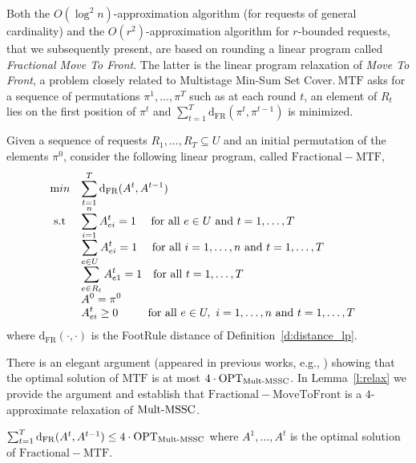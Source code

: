 Both the $O(\log^2 n)$-approximation algorithm (for requests of general cardinality) and the $O(r^2 )$-approximation algorithm for $r$-bounded requests, that we subsequently present,
are based on rounding a linear program called \textit{Fractional Move To Front}. The latter is the linear program relaxation of \textit{Move To Front}, a problem closely related to Multistage Min-Sum Set Cover.$~\mathrm{MTF}$ asks for a sequence of permutations $\pi^1,\ldots,\pi^T$ such as at each round $t$, an element of $R_t$ lies on the first position of $\pi^t$ and $\sum_{t=1}^T \mathrm{d}_{\mathrm{FR}}(\pi^t,\pi^{t-1})$ is minimized.

\begin{definition}\label{d:frac_MTF}
Given a sequence of requests $R_1,\ldots,R_T \subseteq U$ and an initial permutation of the elements $\pi^0$, consider the following linear program, called $\mathrm{Fractional- MTF}$,
\begin{equation*}
    \begin{array}{ll@{}ll}
        \text min & \displaystyle \sum_{t=1}^{T} \mathrm{d}_{\mathrm{FR}}(A^t,A^{t-1})&\\
        \text{ s.t } & \displaystyle \sum_{i=1}^{n} A_{ei}^t = 1 ~~~~\text{for all }e \in U\text{ and } t = 1,\ldots, T &&\\
        & \displaystyle \sum_{e \in U} A_{ei}^t = 1 ~~~~\text{for all }i = 1,\ldots,n\text{ and } t = 1,\ldots, T&\\
        & \displaystyle \sum_{e \in R_t} A_{e1}^t = 1 ~~~\text{for all } t = 1,\ldots, T&\\
        & \displaystyle A^0 = \pi^0 &&\\
        & \displaystyle A_{ei}^t \geq 0 ~~~~~~~~\text{for all } e \in U, ~i = 1,\ldots, n\text{ and } t = 1,\ldots, T&\\
    \end{array}
\end{equation*}
where $\mathrm{d}_{\mathrm{FR}}(\cdot,\cdot)$ is the FootRule distance of Definition~\ref{d:distance_lp}.
\end{definition}
\noindent  There is an elegant argument (appeared in previous works, e.g., \cite{FKKSV20})
showing that the optimal solution of $\mathrm{MTF}$ is at most $4 \cdot \mathrm{OPT}_{\mathrm{Mult}\text{-}\mathrm{MSSC}}$. In Lemma~\ref{l:relax} we provide the argument and establish that $\mathrm{Fractional- MoveToFront}$ is a $4$-approximate relaxation of $\mathrm{Mult}\text{-}\mathrm{MSSC}$.
\begin{lemma}\label{l:relax}
$\sum_{t=1}^T \mathrm{d}_{\mathrm{FR}}(A^t,A^{t-1}) \leq 4 \cdot \mathrm{OPT}_{\mathrm{Mult}\text{-}\mathrm{MSSC}}$
where $A^1,\ldots,A^t$ is the optimal solution of $\mathrm{Fractional- MTF}$.
\end{lemma}


